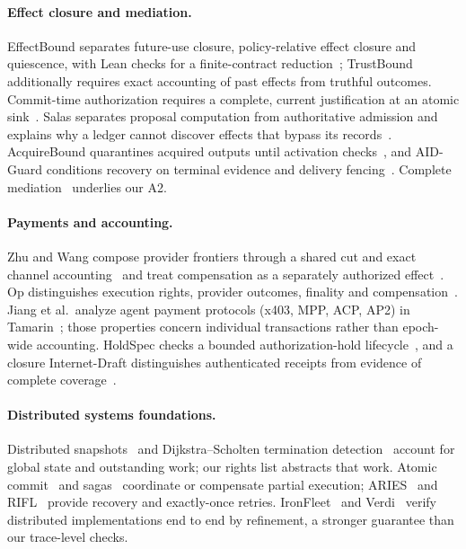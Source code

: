 \documentclass[runningheads]{llncs}
\begin{document}
\paragraph{Effect closure and mediation.}
EffectBound separates future-use closure, policy-relative effect closure and
quiescence, with Lean checks for a finite-contract reduction~\cite{effectbound};
TrustBound additionally requires exact accounting of past effects from
truthful outcomes. Commit-time authorization requires a complete, current
justification at an atomic sink~\cite{cta}. Salas separates proposal
computation from authoritative admission and explains why a ledger cannot
discover effects that bypass its records~\cite{salas}. AcquireBound quarantines
acquired outputs until activation checks~\cite{acquirebound}, and AID-Guard
conditions recovery on terminal evidence and delivery fencing~\cite{aid}.
Complete mediation~\cite{saltzer1975} underlies our A2.

\paragraph{Payments and accounting.}
Zhu and Wang compose provider frontiers through a shared cut and exact channel
accounting~\cite{quiescence} and treat compensation as a separately authorized
effect~\cite{budget}. Op distinguishes execution rights, provider outcomes,
finality and compensation~\cite{op}. Jiang et al.\ analyze agent payment
protocols (x403, MPP, ACP, AP2) in Tamarin~\cite{protocolanalysis}; those
properties concern individual transactions rather than epoch-wide accounting.
HoldSpec checks a bounded authorization-hold lifecycle~\cite{hold}, and a
closure Internet-Draft distinguishes authenticated receipts from evidence of
complete coverage~\cite{closuredraft}.

\paragraph{Distributed systems foundations.}
Distributed snapshots~\cite{chandy} and Dijkstra--Scholten termination
detection~\cite{dijkstra1980} account for global state and outstanding work; our
rights list abstracts that work. Atomic commit~\cite{gray2006} and
sagas~\cite{sagas1987} coordinate or compensate partial execution;
ARIES~\cite{aries1992} and RIFL~\cite{rifl2015} provide recovery and exactly-once
retries. IronFleet~\cite{ironfleet2015} and Verdi~\cite{verdi2015} verify
distributed implementations end to end by refinement, a stronger guarantee than
our trace-level checks.
\end{document}
